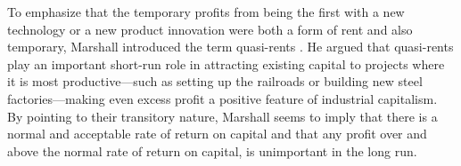 To emphasize that the temporary profits from being the first with a new technology or a new product innovation were both a form of rent and also temporary, Marshall introduced the term \glspl{quasi-rent} \cite{johnsonRentModernEconomic1902}.  He argued that  quasi-rents play an important short-run role in attracting existing capital to projects where it is most productive---such as setting up the railroads or building new steel factories---making even excess profit a positive feature of industrial capitalism. By pointing to their transitory nature, Marshall seems to imply that there is a normal and acceptable rate of return on capital and that any  profit over and above the normal rate of return on capital, is unimportant in the long run.  

